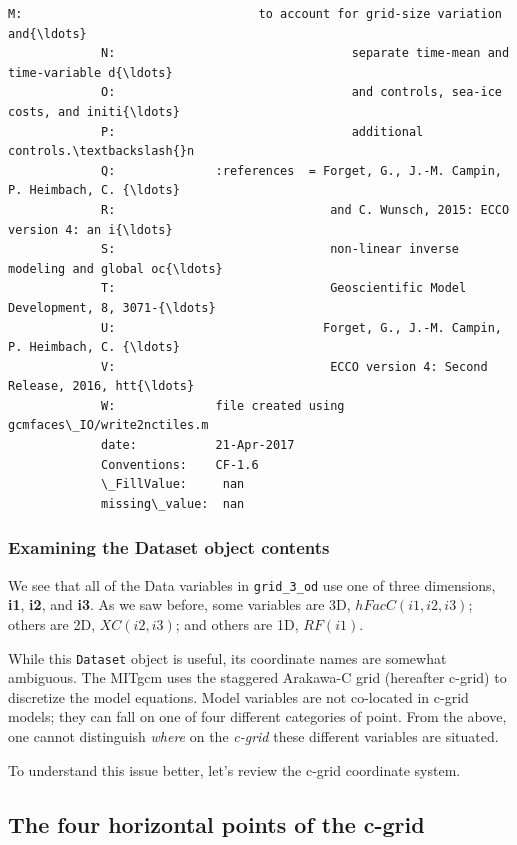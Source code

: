 \documentclass[11pt]{article}
\begin{document}
\begin{Verbatim}[commandchars=\\\{\}]
             M:                                 to account for grid-size variation and{\ldots}
             N:                                 separate time-mean and time-variable d{\ldots}
             O:                                 and controls, sea-ice costs, and initi{\ldots}
             P:                                 additional controls.\textbackslash{}n 
             Q:              :references  = Forget, G., J.-M. Campin, P. Heimbach, C. {\ldots}
             R:                              and C. Wunsch, 2015: ECCO version 4: an i{\ldots}
             S:                              non-linear inverse modeling and global oc{\ldots}
             T:                              Geoscientific Model Development, 8, 3071-{\ldots}
             U:                             Forget, G., J.-M. Campin, P. Heimbach, C. {\ldots}
             V:                              ECCO version 4: Second Release, 2016, htt{\ldots}
             W:              file created using gcmfaces\_IO/write2nctiles.m
             date:           21-Apr-2017
             Conventions:    CF-1.6
             \_FillValue:     nan
             missing\_value:  nan
\end{Verbatim}
            
    \subsubsection{Examining the Dataset object
contents}\label{examining-the-dataset-object-contents}

We see that all of the Data variables in \texttt{grid\_3\_od} use one of
three dimensions, \textbf{i1}, \textbf{i2}, and \textbf{i3}. As we saw
before, some variables are 3D, \(hFacC(i1,i2,i3)\); others are 2D,
\(XC(i2,i3)\); and others are 1D, \(RF(i1)\).

While this \texttt{Dataset} object is useful, its coordinate names are
somewhat ambiguous. The MITgcm uses the staggered Arakawa-C grid
(hereafter c-grid) to discretize the model equations. Model variables
are not co-located in c-grid models; they can fall on one of four
different categories of point. From the above, one cannot distinguish
\emph{where} on the \emph{c-grid} these different variables are
situated.

To understand this issue better, let's review the c-grid coordinate
system.

\subsection{The four horizontal points of the
c-grid}\label{the-four-horizontal-points-of-the-c-grid}
\end{document}
